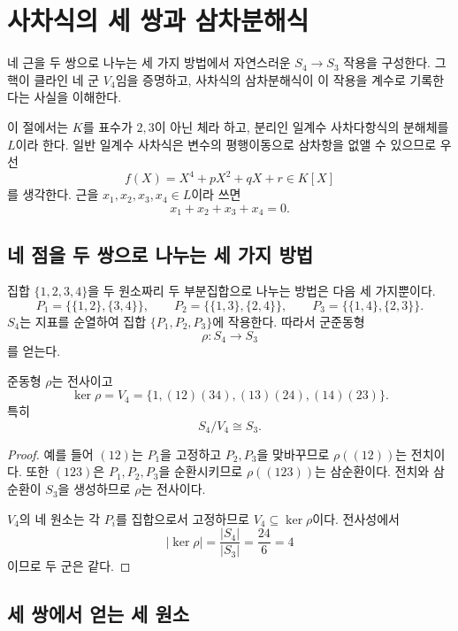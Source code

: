 \clearpage
\section{사차식의 세 쌍과 삼차분해식}
\label{sec:quartic-resolvent}

\begin{learninggoal}
네 근을 두 쌍으로 나누는 세 가지 방법에서 자연스러운 $S_4\to S_3$ 작용을 구성한다. 그 핵이 클라인 네 군 $V_4$임을 증명하고, 사차식의 삼차분해식이 이 작용을 계수로 기록한다는 사실을 이해한다.
\end{learninggoal}

이 절에서는 $K$를 표수가 $2,3$이 아닌 체라 하고, 분리인 일계수 사차다항식의 분해체를 $L$이라 한다. 일반 일계수 사차식은 변수의 평행이동으로 삼차항을 없앨 수 있으므로 우선
\[
  f(X)=X^4+pX^2+qX+r\in K[X]
\]
를 생각한다. 근을 $x_1,x_2,x_3,x_4\in L$이라 쓰면
\[
  x_1+x_2+x_3+x_4=0.
\]

\subsection{네 점을 두 쌍으로 나누는 세 가지 방법}

집합 $\{1,2,3,4\}$을 두 원소짜리 두 부분집합으로 나누는 방법은 다음 세 가지뿐이다.
\[
  P_1=\{\{1,2\},\{3,4\}\},\qquad
  P_2=\{\{1,3\},\{2,4\}\},\qquad
  P_3=\{\{1,4\},\{2,3\}\}.
\]
$S_4$는 지표를 순열하여 집합 $\{P_1,P_2,P_3\}$에 작용한다. 따라서 군준동형
\[
  \rho:S_4\longrightarrow S_3
\]
를 얻는다.

\begin{proposition}
\label{prop:s4-to-s3-kernel}
준동형 $\rho$는 전사이고
\[
  \ker\rho
  =V_4
  =\{1,(12)(34),(13)(24),(14)(23)\}.
\]
특히
\[
  S_4/V_4\cong S_3.
\]
\end{proposition}

\begin{proof}
예를 들어 $(12)$는 $P_1$을 고정하고 $P_2,P_3$을 맞바꾸므로 $\rho((12))$는 전치이다. 또한 $(123)$은 $P_1,P_2,P_3$을 순환시키므로 $\rho((123))$는 삼순환이다. 전치와 삼순환이 $S_3$을 생성하므로 $\rho$는 전사이다.

$V_4$의 네 원소는 각 $P_i$를 집합으로서 고정하므로 $V_4\subseteq\ker\rho$이다. 전사성에서
\[
  |\ker\rho|=\frac{|S_4|}{|S_3|}=\frac{24}{6}=4
\]
이므로 두 군은 같다.
\end{proof}

\subsection{세 쌍에서 얻는 세 원소}

